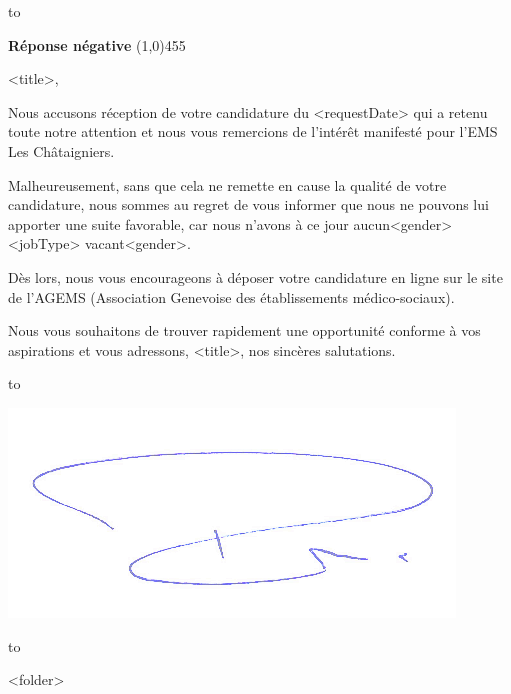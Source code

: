\documentclass[a4paper, 12pt]{letter}
\begin{document}

\hbox to 

\bigbreak

\begin{flushleft}
	\textbf{Réponse négative}
	\line(1,0){455}
\end{flushleft}
\bigbreak

<title>,

Nous accusons réception de votre candidature du <requestDate> qui a retenu toute notre attention et nous vous remercions de l’intérêt manifesté pour l’EMS Les Châtaigniers.

Malheureusement, sans que cela ne remette en cause la qualité de votre candidature, nous sommes au regret de vous informer que nous ne pouvons lui apporter une suite favorable, car nous n’avons à ce jour aucun<gender> <jobType> vacant<gender>.

Dès lors, nous vous encourageons à déposer votre candidature en ligne sur le site de l’AGEMS (Association Genevoise des établissements médico-sociaux).

Nous vous souhaitons de trouver rapidement une opportunité conforme à vos aspirations et vous adressons, <title>, nos sincères salutations.

\bigbreak
\bigbreak
\bigbreak
\bigbreak

\hbox to 
\begin{flushright}
\includegraphics{sign.png}
\end{flushright}

\hbox to 

\bigbreak
\bigbreak

<folder>
\end{document}
